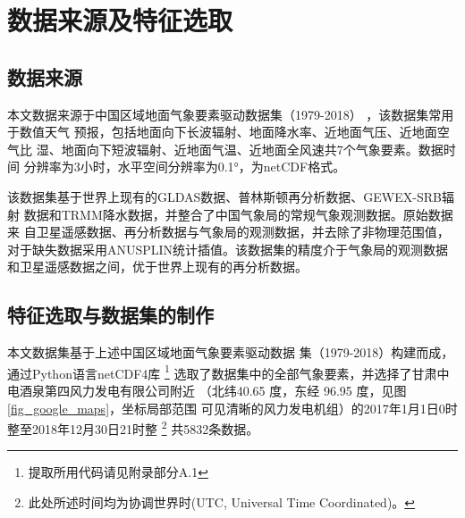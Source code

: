 \documentclass[AutoFakeBold]{LZUThesis}
\begin{document}



\chapter{数据来源及特征选取}
\section{数据来源}
本文数据来源于中国区域地面气象要素驱动数据集（1979-2018）
，该数据集常用于数值天气
预报，包括地面向下长波辐射、地面降水率、近地面气压、近地面空气比
湿、地面向下短波辐射、近地面气温、近地面全风速共7个气象要素。数据时间
分辨率为3小时，水平空间分辨率为0.1°，为netCDF格式。

该数据集基于世界上现有的GLDAS数据、普林斯顿再分析数据、GEWEX-SRB辐射
数据和TRMM降水数据，并整合了中国气象局的常规气象观测数据。原始数据来
自卫星遥感数据、再分析数据与气象局的观测数据，并去除了非物理范围值，
对于缺失数据采用ANUSPLIN统计插值。该数据集的精度介于气象局的观测数据
和卫星遥感数据之间，优于世界上现有的再分析数据。

\section{特征选取与数据集的制作}
本文数据集基于上述中国区域地面气象要素驱动数据
集（1979-2018）构建而成，通过Python语言netCDF4库
\footnote{提取所用代码请见附录部分A.1}
选取了数据集中的全部气象要素，并选择了甘肃中电酒泉第四风力发电有限公司附近
（北纬40.65 度，东经 96.95 度，见图\ref{fig_google_maps}，坐标局部范围
可见清晰的风力发电机组）的2017年1月1日0时整至2018年12月30日21时整
\footnote{此处所述时间均为协调世界时(UTC, Universal Time Coordinated)。}
共5832条数据。
\end{document}
